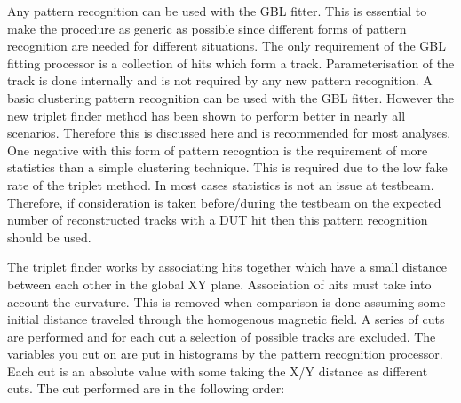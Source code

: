 Any pattern recognition can be used with the GBL fitter. This is essential to make the procedure as generic as possible since different forms of pattern recognition are needed for different situations. The only requirement of the GBL fitting processor is a collection of hits which form a track. Parameterisation of the track is done internally and is not required by any new pattern recognition. A basic clustering pattern recognition can be used with the GBL fitter. However the new triplet finder method has been shown to perform better in nearly all scenarios. Therefore this is discussed here and is recommended for most analyses. One negative with this form of pattern recogntion is the requirement of more statistics than a simple clustering technique. This is required due to the low fake rate  of the triplet method. In most cases statistics is not an issue at testbeam. Therefore, if consideration is taken before/during the testbeam on the expected number of reconstructed tracks with a DUT hit then this pattern recognition should be used.

The triplet finder works by associating hits together which have a small distance between each other in the global XY plane. Association of hits must take into account the curvature. This is removed when comparison is done assuming some initial distance traveled through the homogenous magnetic field. A series of cuts are performed and for each cut a selection of possible tracks are excluded. The variables you cut on are put in histograms by the pattern recognition processor. Each cut is an absolute value with some taking the X/Y distance as different cuts. The cut performed are in the following order:


